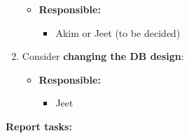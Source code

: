 \documentclass[11pt]{article}
\begin{document}
\begin{enumerate}
  \begin{itemize}
  \tightlist
  \item
    \textbf{Responsible:}

    \begin{itemize}
    \tightlist
    \item
      Akim or Jeet (to be decided)
    \end{itemize}
  \end{itemize}
\item
  Consider \textbf{changing the DB design}:

  \begin{itemize}
  \tightlist
  \item
    \textbf{Responsible:}

    \begin{itemize}
    \tightlist
    \item
      Jeet
    \end{itemize}
  \end{itemize}
\end{enumerate}

\textbf{Report tasks:}
\end{document}
